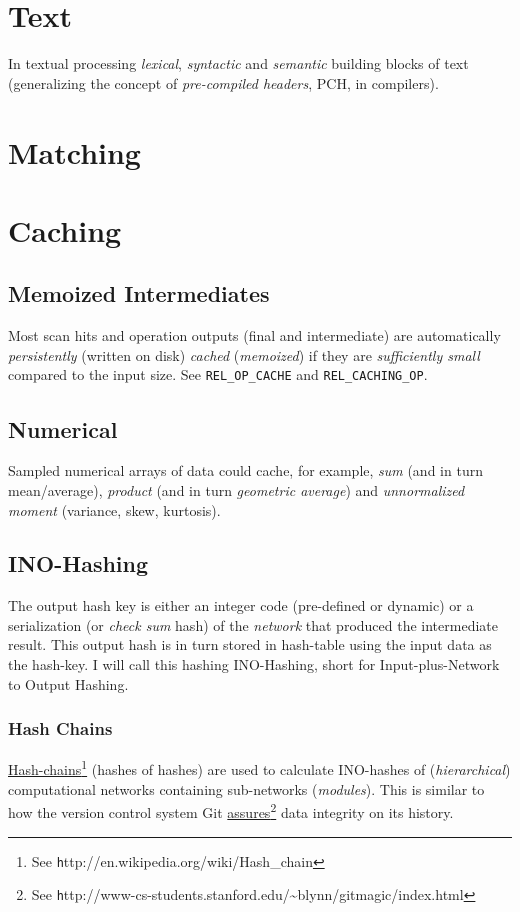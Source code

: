 \documentclass[a4paper,10pt,twocolumn]{article}
\newcommand{\codeREL}[1]{\lstset{language=C++}\lstinline!REL_#1!}
\newcommand{\hrefn}[2]{\href{#1}{#2}\footnote{See {\texttt #1}}} %
\begin{document}
\section{Text}

In textual processing \emph{lexical}, \emph{syntactic} and \emph{semantic}
building blocks of text (generalizing the concept of \emph{pre-compiled
  headers}, PCH, in compilers).

\section{Matching}

\section{Caching}

\subsection{Memoized Intermediates}
Most scan hits and operation outputs (final and intermediate) are automatically
\emph{persistently} (written on disk) \emph{cached} (\emph{memoized}) if they
are \emph{sufficiently small} compared to the input size. See \codeREL{OP_CACHE}
and \codeREL{CACHING_OP}.

\subsection{Numerical}

Sampled numerical arrays of data could cache, for example, \emph{sum} (and in
turn mean/average), \emph{product} (and in turn \emph{geometric average}) and
\emph{unnormalized moment} (variance, skew, kurtosis).

\subsection{INO-Hashing}

The output hash key is either an integer code (pre-defined or dynamic) or a
serialization (or \emph{check sum} hash) of the \emph{network} that produced the
intermediate result. This output hash is in turn stored in hash-table using the
input data as the hash-key. I will call this hashing INO-Hashing, short for
Input-plus-Network to Output Hashing.

\subsubsection{Hash Chains}
\hrefn{http://en.wikipedia.org/wiki/Hash_chain}{Hash-chains} (hashes of hashes)
are used to calculate INO-hashes of (\emph{hierarchical}) computational networks
containing sub-networks (\emph{modules}). This is similar to how the version
control system Git
\hrefn{http://www-cs-students.stanford.edu/\~{}blynn/gitmagic/index.html}{assures}
data integrity on its history.
\end{document}
